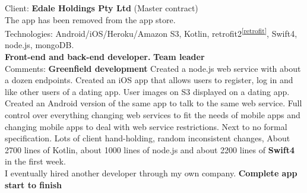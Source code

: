 \documentclass{article}
\begin{document}
Client: 	\textbf  {Edale Holdings Pty Ltd } (Master contract) \\
The app has been removed from the app store. \\
Technologies: 	Android/iOS/Heroku/Amazon S3, Kotlin, retrofit2\textsuperscript{\ref{retrofit}}, Swift4, node.js, mongoDB. \\
\textbf{ 		Front-end and back-end developer. } {\bf Team leader}  \\
Comments:	{\bf Greenfield development} Created a node.js web service with about a dozen endpoints. Created an iOS app that allows users to register, log in and like other users of a dating app. User images on S3 displayed on a dating app. Created an Android version of the same app to talk to the same web service. Full control over everything changing web services to fit the needs of mobile apps and changing mobile apps to deal with web service restrictions. Next to no formal specification. Lots of client hand-holding, random inconsistent changes, About 2700 lines of Kotlin, about 1000 lines of node.js and about 2200 lines of {\bf Swift4} in the first week.\\ I eventually hired another developer through my own company.
\textbf{Complete app start to finish} \\
\\
\end{document}
